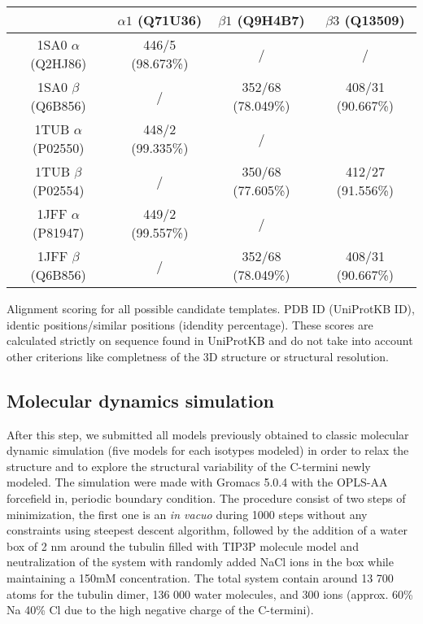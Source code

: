 \documentclass[a4paper]{article}
\begin{document}
\begin{center}
  \begin{tabular}{|c|c|c|c|}
    \hline
     & $\alpha1$ (Q71U36) & $\beta1$ (Q9H4B7) & $\beta3$ (Q13509) \\
    \hline
    1SA0 $\alpha$ (Q2HJ86) & 446/5 (98.673\%) & / & / \\
    \hline
    1SA0 $\beta$ (Q6B856) & / & 352/68 (78.049\%) & 408/31 (90.667\%) \\
    \hline
    1TUB $\alpha$ (P02550) & 448/2 (99.335\%) & / & \\
    \hline
    1TUB $\beta$ (P02554) & / & 350/68 (77.605\%) & 412/27 (91.556\%) \\
    \hline
    1JFF $\alpha$ (P81947) & 449/2 (99.557\%) & / & \\
    \hline
    1JFF $\beta$ (Q6B856) & / & 352/68 (78.049\%) & 408/31 (90.667\%) \\
    \hline
  \end{tabular}
  \caption{Alignment scoring for all possible candidate templates. PDB ID (UniProtKB ID), identic positions/similar
  positions (idendity percentage). These scores are calculated strictly on sequence found in UniProtKB and do
  not take into account other criterions like completness of the 3D structure or structural resolution.}
\end{center}

\subsection{Molecular dynamics simulation}

After this step, we submitted all models previously obtained to classic molecular dynamic simulation (five
models for each isotypes modeled) in order to relax the structure and to explore the structural variability
of the C-termini newly modeled. The simulation were made with Gromacs 5.0.4 with the OPLS-AA forcefield in,
periodic boundary condition. The procedure consist of two steps of minimization, the first one is an
\textit{in vacuo} during 1000 steps without any constraints using steepest descent algorithm, followed by the addition
of a water box of 2 nm around the tubulin filled with TIP3P molecule model and neutralization of the system
with randomly added NaCl ions in the box while maintaining a 150mM concentration. The total system contain around
13 700 atoms for the tubulin dimer, 136 000 water molecules, and 300 ions (approx. 60\% Na 40\% Cl due to the high
negative charge of the C-termini).
\end{document}

